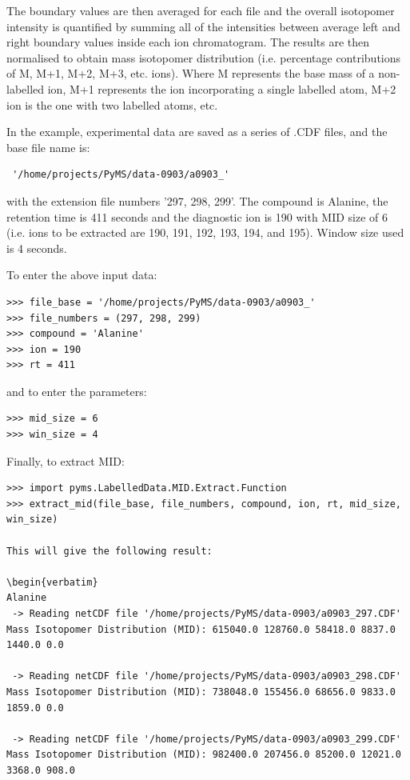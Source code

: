 The boundary values are then averaged for each file and the overall isotopomer
intensity is quantified by summing all of the intensities between average left and
right boundary values inside each ion chromatogram. The results are
then normalised to obtain mass isotopomer distribution (i.e. percentage
contributions of M, M+1, M+2, M+3, etc. ions). Where M represents the base mass of 
a non-labelled ion, M+1 represents the ion incorporating a single labelled atom, 
M+2 ion is the one with two labelled atoms, etc.

In the example, experimental data are saved as a series of .CDF files, and the base 
file name is:
\begin{verbatim}
 '/home/projects/PyMS/data-0903/a0903_'
\end{verbatim}
 with the extension file numbers '297, 298, 299'. The compound is Alanine, the 
retention time is 411 seconds and the diagnostic ion is 190 with MID size of 6 
(i.e. ions to be extracted are 190, 191, 192, 193, 194, and 195). Window size 
used is 4 seconds.

To enter the above input data:

\begin{verbatim}
>>> file_base = '/home/projects/PyMS/data-0903/a0903_'
>>> file_numbers = (297, 298, 299)
>>> compound = 'Alanine'
>>> ion = 190
>>> rt = 411 
\end{verbatim}

and to enter the parameters:

\begin{verbatim} 
>>> mid_size = 6 
>>> win_size = 4 
\end{verbatim}

Finally, to extract MID:
\begin{verbatim}
>>> import pyms.LabelledData.MID.Extract.Function
>>> extract_mid(file_base, file_numbers, compound, ion, rt, mid_size, win_size)

This will give the following result:

\begin{verbatim}
Alanine
 -> Reading netCDF file '/home/projects/PyMS/data-0903/a0903_297.CDF'
Mass Isotopomer Distribution (MID): 615040.0 128760.0 58418.0 8837.0 1440.0 0.0 

 -> Reading netCDF file '/home/projects/PyMS/data-0903/a0903_298.CDF'
Mass Isotopomer Distribution (MID): 738048.0 155456.0 68656.0 9833.0 1859.0 0.0 

 -> Reading netCDF file '/home/projects/PyMS/data-0903/a0903_299.CDF'
Mass Isotopomer Distribution (MID): 982400.0 207456.0 85200.0 12021.0 3368.0 908.0 
\end{verbatim}


